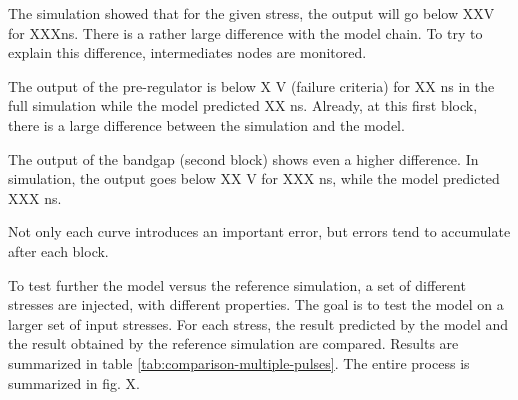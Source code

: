 
The simulation showed that for the given stress, the output will go below XXV for XXXns.
There is a rather large difference with the model chain.
To try to explain this difference, intermediates nodes are monitored.

The output of the pre-regulator is below X V (failure criteria) for XX ns in the full simulation while the model predicted XX ns.
Already, at this first block, there is a large difference between the simulation and the model.

The output of the bandgap (second block) shows even a higher difference.
In simulation, the output goes below XX V for XXX ns, while the model predicted XXX ns.

Not only each curve introduces an important error, but errors tend to accumulate after each block.

To test further the model versus the reference simulation, a set of different stresses are injected, with different properties.
The goal is to test the model on a larger set of input stresses.
For each stress, the result predicted by the model and the result obtained by the reference simulation are compared.
Results are summarized in table \ref{tab:comparison-multiple-pulses}.
The entire process is summarized in fig. X.

